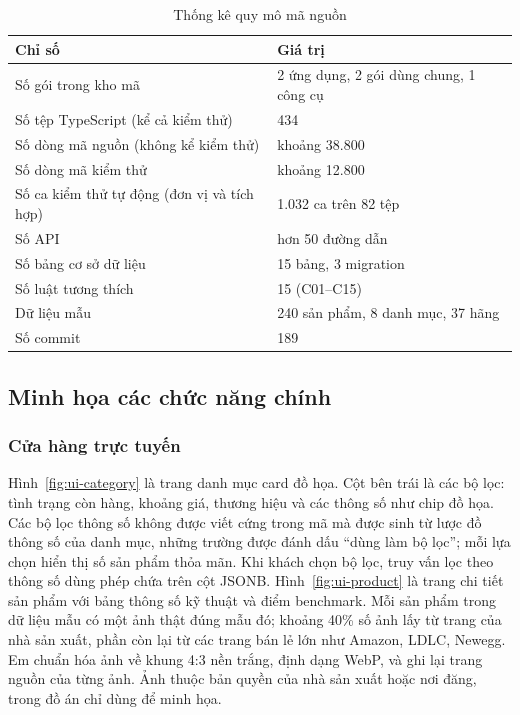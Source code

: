 \begin{table}[H]
\centering\small
\begin{tabular}{|L{8.4cm}|R{4.6cm}|}
\hline
\textbf{Chỉ số} & \textbf{Giá trị} \\ \hline
Số gói trong kho mã & 2 ứng dụng, 2 gói dùng chung, 1 công cụ \\ \hline
Số tệp TypeScript (kể cả kiểm thử) & 434 \\ \hline
Số dòng mã nguồn (không kể kiểm thử) & khoảng 38.800 \\ \hline
Số dòng mã kiểm thử & khoảng 12.800 \\ \hline
Số ca kiểm thử tự động (đơn vị và tích hợp) & 1.032 ca trên 82 tệp \\ \hline
Số API & hơn 50 đường dẫn \\ \hline
Số bảng cơ sở dữ liệu & 15 bảng, 3 migration \\ \hline
Số luật tương thích & 15 (C01--C15) \\ \hline
Dữ liệu mẫu & 240 sản phẩm, 8 danh mục, 37 hãng \\ \hline
Số commit & 189 \\ \hline
\end{tabular}
\caption{Thống kê quy mô mã nguồn}
\label{tab:thong-ke-ma}
\end{table}

\subsection{Minh họa các chức năng chính}

\subsubsection{Cửa hàng trực tuyến}


Hình~\ref{fig:ui-category} là trang danh mục card đồ họa. Cột bên trái là các bộ lọc: tình trạng còn hàng, khoảng giá, thương hiệu và các thông số như chip đồ họa. Các bộ lọc thông số không được viết cứng trong mã mà được sinh từ lược đồ thông số của danh mục, những trường được đánh dấu ``dùng làm bộ lọc''; mỗi lựa chọn hiển thị số sản phẩm thỏa mãn. Khi khách chọn bộ lọc, truy vấn lọc theo thông số dùng phép chứa trên cột JSONB. Hình~\ref{fig:ui-product} là trang chi tiết sản phẩm với bảng thông số kỹ thuật và điểm benchmark. Mỗi sản phẩm trong dữ liệu mẫu có một ảnh thật đúng mẫu đó; khoảng 40\% số ảnh lấy từ trang của nhà sản xuất, phần còn lại từ các trang bán lẻ lớn như Amazon, LDLC, Newegg. Em chuẩn hóa ảnh về khung 4:3 nền trắng, định dạng WebP, và ghi lại trang nguồn của từng ảnh. Ảnh thuộc bản quyền của nhà sản xuất hoặc nơi đăng, trong đồ án chỉ dùng để minh họa.

